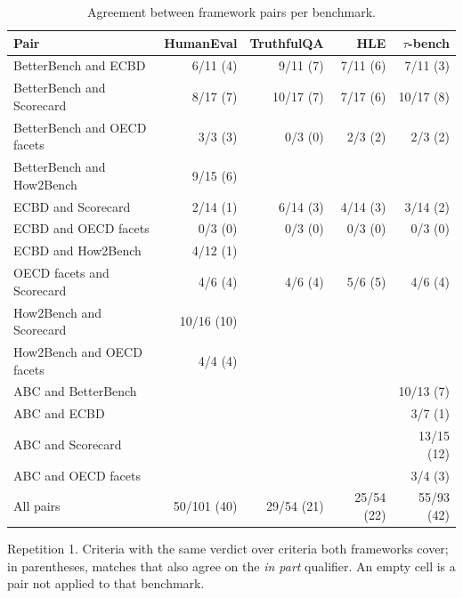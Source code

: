\documentclass[10pt,conference]{IEEEtran}
\begin{document}
\begin{table}[t]
\caption{Agreement between framework pairs per benchmark.}
\label{tab:pairwise}
\centering
\small\begin{tabular}{lrrrr}\toprule
\textbf{Pair} & \textbf{HumanEval} & \textbf{TruthfulQA} & \textbf{HLE} & \textbf{$\tau$-bench} \\
\midrule
BetterBench and ECBD & 6/11 (4) & 9/11 (7) & 7/11 (6) & 7/11 (3) \\
BetterBench and Scorecard & 8/17 (7) & 10/17 (7) & 7/17 (6) & 10/17 (8) \\
BetterBench and OECD facets & 3/3 (3) & 0/3 (0) & 2/3 (2) & 2/3 (2) \\
BetterBench and How2Bench & 9/15 (6) &  &  &  \\
\midrule
ECBD and Scorecard & 2/14 (1) & 6/14 (3) & 4/14 (3) & 3/14 (2) \\
ECBD and OECD facets & 0/3 (0) & 0/3 (0) & 0/3 (0) & 0/3 (0) \\
ECBD and How2Bench & 4/12 (1) &  &  &  \\
OECD facets and Scorecard & 4/6 (4) & 4/6 (4) & 5/6 (5) & 4/6 (4) \\
\midrule
How2Bench and Scorecard & 10/16 (10) &  &  &  \\
How2Bench and OECD facets & 4/4 (4) &  &  &  \\
\midrule
ABC and BetterBench &  &  &  & 10/13 (7) \\
ABC and ECBD &  &  &  & 3/7 (1) \\
ABC and Scorecard &  &  &  & 13/15 (12) \\
ABC and OECD facets &  &  &  & 3/4 (3) \\
\midrule
All pairs & 50/101 (40) & 29/54 (21) & 25/54 (22) & 55/93 (42) \\
\bottomrule\end{tabular}
\par\vspace{2pt}\raggedright\footnotesize Repetition 1. Criteria with the same verdict over criteria both frameworks cover; in parentheses, matches that also agree on the \emph{in part} qualifier. An empty cell is a pair not applied to that benchmark.
\end{table}
\end{document}
